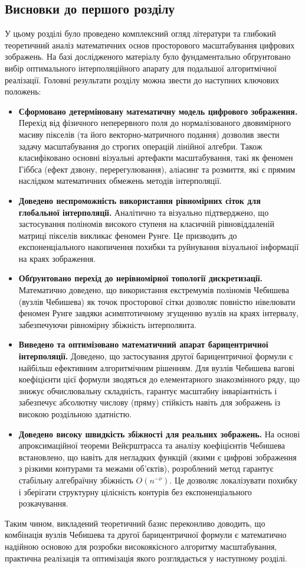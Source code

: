 \subsection{Висновки до першого розділу}

У цьому розділі було проведено комплексний огляд літератури та глибокий теоретичний аналіз математичних основ просторового масштабування цифрових зображень. На базі дослідженого матеріалу було фундаментально обґрунтовано вибір оптимального інтерполяційного апарату для подальшої алгоритмічної реалізації. Головні результати розділу можна звести до наступних ключових положень:

\begin{itemize}
	\item \textbf{Сформовано детерміновану математичну модель цифрового зображення.} Перехід від фізичного неперервного поля до нормалізованого двовимірного масиву пікселів (та його векторно-матричного подання) дозволив звести задачу масштабування до строгих операцій лінійної алгебри. Також класифіковано основні візуальні артефакти масштабування, такі як феномен Гіббса (ефект дзвону, перерегулювання), аліасинг та розмиття, які є прямим наслідком математичних обмежень методів інтерполяції.
	
	\item \textbf{Доведено неспроможність використання рівномірних сіток для глобальної інтерполяції.} Аналітично та візуально підтверджено, що застосування поліномів високого ступеня на класичній рівновіддаленій матриці пікселів викликає феномен Рунге. Це призводить до експоненціального накопичення похибки та руйнування візуальної інформації на краях зображення.
	
	\item \textbf{Обґрунтовано перехід до нерівномірної топології дискретизації.} Математично доведено, що використання екстремумів поліномів Чебишева (вузлів Чебишева) як точок просторової сітки дозволяє повністю нівелювати феномен Рунге завдяки асимптотичному згущенню вузлів на краях інтервалу, забезпечуючи рівномірну збіжність інтерполянта.
	
	\item \textbf{Виведено та оптимізовано математичний апарат барицентричної інтерполяції.} Доведено, що застосування другої барицентричної формули є найбільш ефективним алгоритмічним рішенням. Для вузлів Чебишева вагові коефіцієнти цієї формули зводяться до елементарного знакозмінного ряду, що знижує обчислювальну складність, гарантує масштабну інваріантність і забезпечує абсолютну числову (пряму) стійкість навіть для зображень із високою роздільною здатністю.
	
	\item \textbf{Доведено високу швидкість збіжності для реальних зображень.} На основі апроксимаційної теореми Вейєрштрасса та аналізу коефіцієнтів Чебишева встановлено, що навіть для негладких функцій (якими є цифрові зображення з різкими контурами та межами об'єктів), розроблений метод гарантує стабільну алгебраїчну збіжність $O(n^{-\nu})$. Це дозволяє локалізувати похибку і зберігати структурну цілісність контурів без експоненціального розкачування.
\end{itemize}

Таким чином, викладений теоретичний базис переконливо доводить, що комбінація вузлів Чебишева та другої барицентричної формули є математично надійною основою для розробки високоякісного алгоритму масштабування, практична реалізація та оптимізація якого розглядається у наступному розділі.